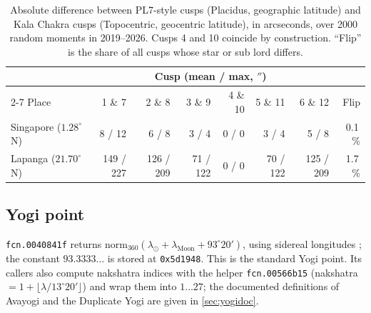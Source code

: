 \begin{table}[htbp]
  \centering
  \small
  \caption[Placidus (PL7) versus Topocentric (Kala Chakra) cusps]{Absolute difference
  between PL7-style cusps (Placidus, geographic latitude) and Kala Chakra cusps
  (Topocentric, geocentric latitude), in arcseconds, over 2000 random moments in
  2019--2026. Cusps 4 and 10 coincide by construction. ``Flip'' is the share of all cusps
  whose star or sub lord differs.}
  \label{tab:cusps}
  \begin{tabular}{l rrrrrr r}
    \toprule
     & \multicolumn{6}{c}{Cusp (mean / max, $''$)} & \\
    \cmidrule(lr){2-7}
    Place & 1 \& 7 & 2 \& 8 & 3 \& 9 & 4 \& 10 & 5 \& 11 & 6 \& 12 & Flip \\
    \midrule
    Singapore ($1.28^\circ$N) & 8 / 12 & 6 / 8 & 3 / 4 & 0 / 0 & 3 / 4 & 5 / 8 & 0.1\,\% \\
    Lapanga ($21.70^\circ$N) & 149 / 227 & 126 / 209 & 71 / 122 & 0 / 0 & 70 / 122 & 125 / 209 & 1.7\,\% \\
    \bottomrule
  \end{tabular}
\end{table}

\subsection{Yogi point}
\label{sec:yogi}

\texttt{fcn.0040841f} returns $\mathrm{norm}_{360}(\lambda_\odot + \lambda_\text{Moon} +
93^\circ 20')$, using sidereal longitudes \tagBIN; the constant $93.3333\ldots$ is stored at
\texttt{0x5d1948}. This is the standard Yogi point. Its callers also compute nakshatra
indices with the helper \texttt{fcn.00566b15} (nakshatra $= 1 + \lfloor \lambda / 13^\circ
20' \rfloor$) and wrap them into $1\ldots27$; the documented definitions of Avayogi and
the Duplicate Yogi are given in \autoref{sec:yogidoc}.
